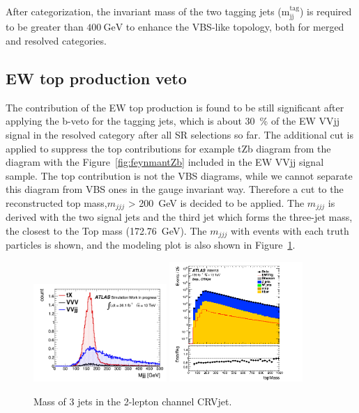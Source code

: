 After categorization, the invariant mass of the two tagging jets ($\mathrm{m}_{\mathrm{jj}}^{\text {tag}}$) is required to be greater than $400~\mathrm{GeV}$ to enhance the VBS-like topology, both for merged and resolved categories.

\subsection{EW top production veto}
The contribution of the EW top production is found to be still significant after applying the b-veto for the tagging jets, which is about 30~\% of the EW VVjj signal in the resolved category after all SR selections so far.
The additional cut is applied to suppress the top contributions for example tZb diagram from the diagram with the Figure~\ref{fig:feynmantZb} included in the EW VVjj signal sample. The top contribution is not the VBS diagrams, while we cannot separate this diagram from VBS ones in the gauge invariant way. Therefore a cut to the reconstructed top mass,$m_{jjj}$ > 200~GeV is decided to be applied. The $m_{jjj}$ is derived with the two signal jets and the third jet which forms the three-jet mass, the closest to the Top mass (172.76~GeV). The $m_{jjj}$ with events with each truth particles is shown, and the modeling plot is also shown in Figure~\ref{fig:2leptopMass}. 
\begin{figure}[H]
    \begin{center}
      \includegraphics[width=0.45\textwidth]{figures/2lep/topMass/WZjjtopMasspeak}
      \includegraphics[width=0.45\textwidth]{figures/2lep/dataMC/C_0ptag2pjet_0ptv_CRVjet_topMass_Log}
        \caption{ Mass of 3 jets in the 2-lepton channel CRVjet.}
        \label{fig:2leptopMass}
    \end{center}
\end{figure}

